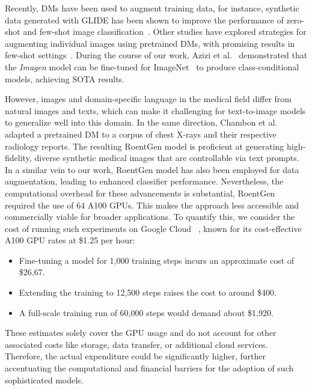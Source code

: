 Recently, DMs have been used to augment training data, for instance, synthetic data generated with GLIDE has been shown to improve the performance of zero-shot and few-shot image classification~\cite{he2023synthetic}. Other studies have explored strategies for augmenting individual images using pretrained DMs, with promising results in few-shot settings~\cite{trabucco2023effective}. During the course of our work, Azizi et al.~\cite{azizi2023synthetic} demonstrated that the \textit{Imagen} model can be fine-tuned for ImageNet~\cite{deng2009imagenet} to produce class-conditional models, achieving SOTA results.

However, images and domain-specific language in the medical field differ from natural images and texts, which can make it challenging for text-to-image models to generalize well into this domain. In the same direction, Chambon et al.~\cite{chambon2022roentgen} adapted a pretrained DM to a corpus of chest X-rays and their respective radiology reports. The resulting RoentGen model is proficient at generating high-fidelity, diverse synthetic medical images that are controllable via text prompts. In a similar vein to our work, RoentGen model has also been employed for data augmentation, leading to enhanced classifier performance. Nevertheless, the computational overhead for these advancements is substantial, RoentGen required the use of 64 A100 GPUs. This makes the approach less accessible and commercially viable for broader applications. To quantify this, we consider the cost of running such experiments on Google Cloud~\cite{cloudgpusCloudGPUs} , known for its cost-effective A100 GPU rates at \$1.25 per hour:

\begin{itemize}
    \item Fine-tuning a model for 1,000 training steps incurs an approximate cost of \$26.67.
    \item Extending the training to 12,500 steps raises the cost to around \$400.
    \item A full-scale training run of 60,000 steps would demand about \$1,920.
\end{itemize}

These estimates solely cover the GPU usage and do not account for other associated costs like storage, data transfer, or additional cloud services. Therefore, the actual expenditure could be significantly higher, further accentuating the computational and financial barriers for the adoption of such sophisticated models.
